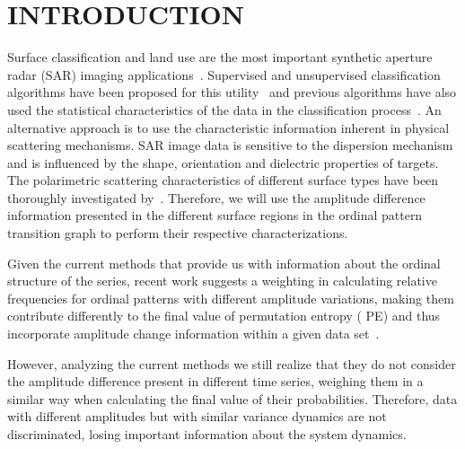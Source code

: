 \documentclass{isprs}
\begin{document}
	
	\maketitle
	
	
	\section{INTRODUCTION}\label{Intro}
	
	\sloppy
	
	Surface classification and land use are the most important synthetic aperture radar (SAR) imaging applications~\citep{Pottier2004Unsupervised}.
	Supervised and unsupervised classification algorithms have been proposed for this utility~\citep{Bhattacharya2018Unsupervised,Chen1996multifrequency,ZYL1992Bayesian} and previous algorithms have also used the statistical characteristics of the data in the classification process~\citep{Lee1992Wishart}.
	An alternative approach is to use the characteristic information inherent in physical scattering mechanisms.
	SAR image data is sensitive to the dispersion mechanism and is influenced by the shape, orientation and dielectric properties of targets.
	The polarimetric scattering characteristics of different surface types have been thoroughly investigated by~\cite{Moriyama2004study, Fujita2004Polarimetric}.
	Therefore, we will use the amplitude difference information presented in the different surface regions in the ordinal pattern transition graph to perform their respective characterizations.
	
	Given the current methods that provide us with information about the ordinal structure of the series, recent work suggests a weighting in calculating relative frequencies for ordinal patterns with different amplitude variations, making them contribute differently to the final value of permutation entropy ( PE) and thus incorporate amplitude change information within a given data set~\citep{Fadlallah2013Weightedpermutation}.
	
	However, analyzing the current methods we still realize that they do not consider the amplitude difference present in different time series, weighing them in a similar way when calculating the final value of their probabilities.
	Therefore, data with different amplitudes but with similar variance dynamics are not discriminated, losing important information about the system dynamics.
	
\end{document}
